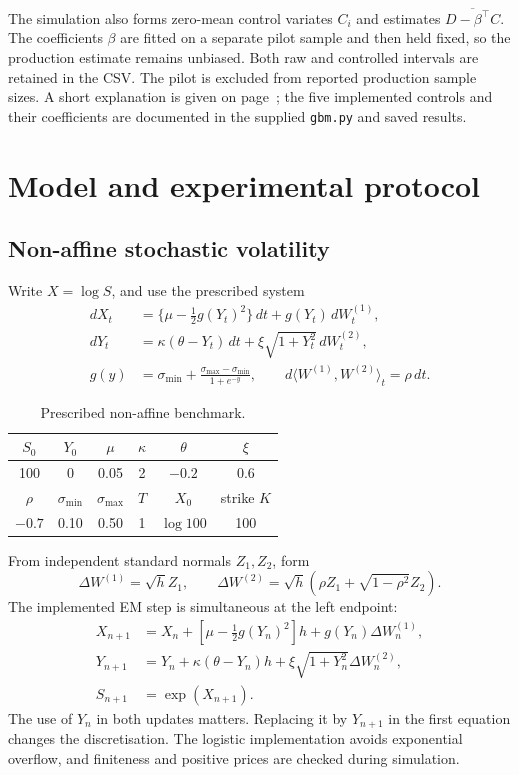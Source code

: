 \documentclass[11pt,a4paper]{article}
\begin{document}
The simulation also forms zero-mean control variates $C_i$ and estimates
$\overline{D-\beta^\top C}$. The coefficients $\beta$ are fitted on a separate pilot sample and then held fixed, so the production estimate remains unbiased. Both raw and controlled intervals are retained in the CSV. The pilot is excluded from reported production sample sizes. A short explanation is given on page~\pageref{sec:gbmweak}; the five implemented controls and their coefficients are documented in the supplied \texttt{gbm.py} and saved results.

\newpage
\section{Model and experimental protocol}\label{sec:protocol}
\subsection{Non-affine stochastic volatility}
Write $X=\log S$, and use the prescribed system
\begin{align}
dX_t&=\{\mu-\tfrac12g(Y_t)^2\}\,dt+g(Y_t)\,dW_t^{(1)},\\
dY_t&=\kappa(\theta-Y_t)\,dt+\xi\sqrt{1+Y_t^2}\,dW_t^{(2)},\\
g(y)&=\sigma_{\min}+\frac{\sigma_{\max}-\sigma_{\min}}{1+e^{-y}},
\qquad d\langle W^{(1)},W^{(2)}\rangle_t=\rho\,dt.
\end{align}
\begin{table}[H]\centering
\caption{Prescribed non-affine benchmark.}
\begin{tabular}{cccccc}\toprule
$S_0$ & $Y_0$ & $\mu$ & $\kappa$ & $\theta$ & $\xi$\\\midrule
100 & 0 & 0.05 & 2 & $-0.2$ & 0.6\\\midrule
$\rho$ & $\sigma_{\min}$ & $\sigma_{\max}$ & $T$ & $X_0$ & strike $K$\\\midrule
$-0.7$ & 0.10 & 0.50 & 1 & $\log 100$ & 100\\\bottomrule
\end{tabular}
\end{table}
From independent standard normals $Z_1,Z_2$, form
\begin{equation}
\Delta W^{(1)}=\sqrt h Z_1,\qquad
\Delta W^{(2)}=\sqrt h(\rho Z_1+\sqrt{1-\rho^2}Z_2).
\end{equation}
The implemented EM step is simultaneous at the left endpoint:
\begin{align}
X_{n+1}&=X_n+[\mu-\tfrac12g(Y_n)^2]h+g(Y_n)\Delta W_n^{(1)},\\
Y_{n+1}&=Y_n+\kappa(\theta-Y_n)h+\xi\sqrt{1+Y_n^2}\Delta W_n^{(2)},\\
S_{n+1}&=\exp(X_{n+1}).
\end{align}
The use of $Y_n$ in both updates matters. Replacing it by $Y_{n+1}$ in the first equation changes the discretisation. The logistic implementation avoids exponential overflow, and finiteness and positive prices are checked during simulation.
\end{document}
